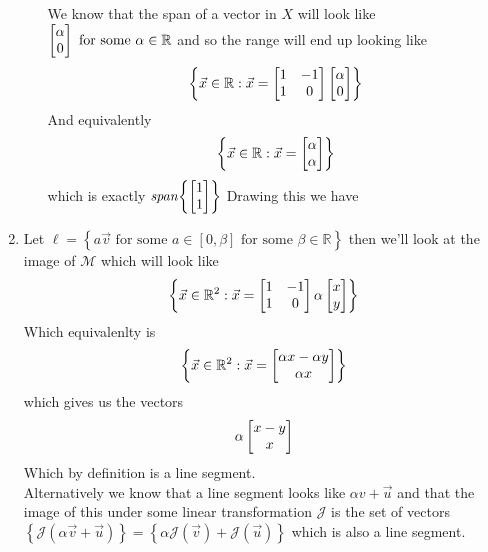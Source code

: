 \documentclass[11pt]{book}
\begin{document}
\begin{enumerate}
\begin{enumerate}
\begin{center}
            \end{center}
            We know that the span of a vector in $X$ will look like $\begin{bmatrix} \alpha \\ 0 \end{bmatrix}\text{ for some  } \alpha \in \mathbb{R}$ and so the range will end up looking like
        \[
        \left\{ \vec{x} \in \mathbb{R} : \vec{x}  = \begin{bmatrix} 1 & -1 \\ 1 & 0 \end{bmatrix} \begin{bmatrix} \alpha  \\ 0 \end{bmatrix} \right\} 
        \]
        And equivalently 
        \[
        \left\{ \vec{x} \in \mathbb{R} :\vec{x} = \begin{bmatrix} \alpha  \\ \alpha  \end{bmatrix} \right\} 
        \]
        which is exactly $\mathit{span} {\left\{ \begin{bmatrix} 1 \\ 1 \end{bmatrix} \right\} } $ 
        Drawing this we have
        \begin{center}
        \end{center}
    \end{enumerate}
\item Let $\ell = \left\{ a \vec{v} \text{ for some  } a \in \left[ 0, \beta  \right] \text{ for some  } \beta \in \mathbb{R}   \right\} $ then we'll look at the image of $\mathcal{M} $ which will look like 
    \[
    \left\{ \vec{x} \in \mathbb{R}^2 : \vec{x} = \begin{bmatrix} 1 & -1 \\ 1 & 0 \end{bmatrix} \alpha \begin{bmatrix} x \\ y \end{bmatrix} \right\} 
    \]
    Which equivalenlty is 
    \[
        \left\{ \vec{x} \in \mathbb{R}^2 :\vec{x} = \begin{bmatrix} \alpha x - \alpha y  \\ \alpha x  \end{bmatrix} \right\} 
    \]
    which gives us the vectors
    \[
    \alpha \begin{bmatrix} x - y \\ x \end{bmatrix}
    \]
    Which by definition is a line segment.\\
    Alternatively we know that a line segment looks like $\alpha v + \vec{u} $ and that the image of this under some linear transformation $\mathcal{J} $ is the set of vectors $\left\{ \mathcal{J}\left(\alpha \vec{v}  + \vec{u} \right)  \right\}= \left\{ \alpha \mathcal{J}\left(\vec{v}\right)  + \mathcal{J}\left(\vec{u} \right)   \right\} $ which is also a line segment.

\end{enumerate}
\end{document}
